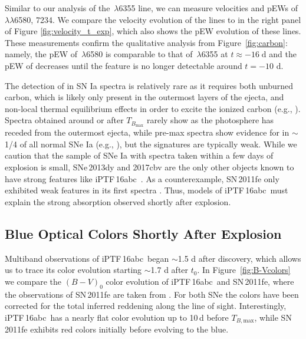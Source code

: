 \documentclass[twocolumn]{aastex61}
\newcommand{\abc}{iPTF\,16abc}
\begin{document}
Similar to our analysis of the \,$\lambda$6355 line, we can measure
velocities and pEWs of \,$\lambda\lambda$6580, 7234. We compare the
velocity evolution of the  lines to  in the right panel
of Figure \ref{fig:velocity_t_exp}, which also shows the pEW evolution of
these lines. These measurements confirm the qualitative analysis from
Figure~\ref{fig:carbon}: namely, the pEW of \,$\lambda$6580 is
comparable to that of \,$\lambda$6355 at $t \approx -16 \;
\mathrm{d}$ and the pEW of  decreases until the feature is no longer
detectable around $t = -10$ d.

The detection of  in SN Ia spectra is relatively rare
as it requires both unburned carbon, which is likely only present in the outermost layers of the ejecta, and non-local thermal equilibrium effects in order to excite the ionized carbon (e.g., \citealt{2007ApJ...654L..53T}). Spectra obtained around or after $T_{B_\mathrm{max}}$ rarely show  as the photosphere has receded from the outermost ejecta, while pre-max spectra show evidence for  in $\sim$1/4 of all normal SNe Ia (e.g., \citealt{2011ApJ...732...30P,2012MNRAS.425.1917S,2011ApJ...743...27T}), but the signatures are typically weak. While we caution that the sample of SNe Ia with spectra taken within a few days of explosion is small, SNe\,2013dy and 2017cbv are the only other objects known to have strong  features like \abc\ \citep{2013ApJ...778L..15Z,2017ApJ...845L..11H}. As a counterexample, SN\,2011fe only exhibited weak  features in its first spectra
\citep{2012ApJ...752L..26P}. Thus, models of \abc\ must explain the strong  absorption observed shortly after explosion.

\subsection{Blue Optical Colors Shortly After Explosion}

Multiband observations of \abc\ began $\sim$1.5 d after discovery, which allows us to trace its color evolution starting $\sim$1.7 d after $t_0$. In Figure~\ref{fig:B-Vcolors} we compare the $(B - V)_0$ color evolution of \abc\ and SN\,2011fe, where the observations of SN\,2011fe are taken from \citet{2016ApJ...820...67Z}. For both SNe the colors have been corrected for the total inferred reddening along the line of sight. Interestingly, \abc\ has a nearly flat color evolution up to 10\,d before $T_{B,\mathrm{max}}$, while SN\,2011fe exhibits red colors initially before evolving to the blue.
\end{document}
